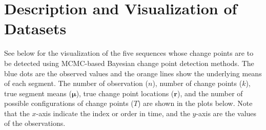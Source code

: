 

\section{Description and Visualization of Datasets}\label{appendix:sequences}
See below for the visualization of the five sequences whose change points are to be detected using MCMC-based Bayesian change point detection methods. The blue dots are the observed values and the orange lines show the underlying means of each segment. The number of observation ($n$), number of change points ($k$), true segment means ($\bm{\mu}$), true change point locations ($\bm{r}$), and the number of possible configurations of change points ($T$) are shown in the plots below. Note that the $x$-axis indicate the index or order in time, and the $y$-axis are the values of the observations.
